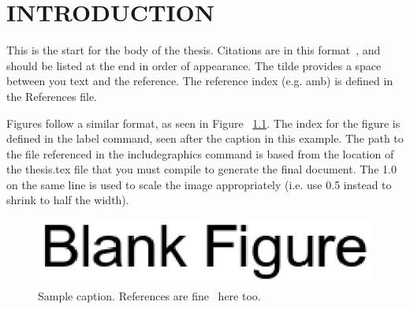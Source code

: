 \chapter{INTRODUCTION}

This is the start for the body of the thesis.  Citations are in this format~\cite{amb}, and should be
listed at the end in order of appearance. The tilde provides a space between you text and
the reference. The reference index (e.g. amb) is defined in the References file.  

Figures follow a similar format, as seen in Figure ~\ref{fig:test1}.  The index for the 
figure is defined in the label command, seen after the caption in this example.  The path
to the file referenced in the includegraphics command is based from the location of the thesis.tex
file that you must compile to generate the final document.  The 1.0 on the same line is used 
to scale the image appropriately (i.e. use 0.5 instead to shrink to half the width).


\begin{figure}[!htbp]
\center
\includegraphics[width = 1.0\columnwidth]{images/blank.eps}
\caption{Sample caption.  References are fine~\cite{amb} here too.} 
\label{fig:test1}
\end{figure}

